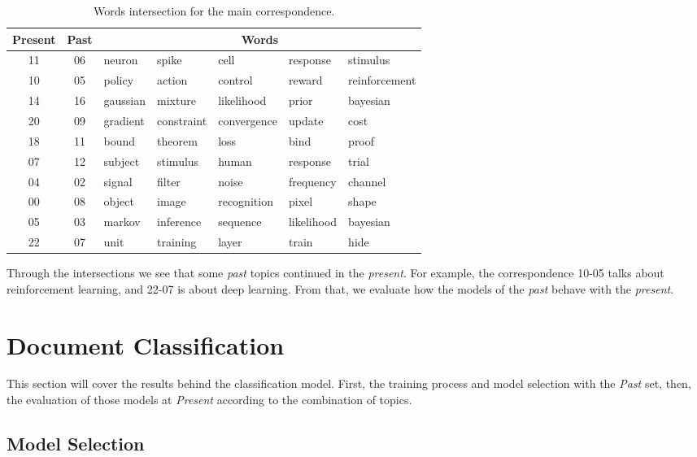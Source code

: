 \begin{table}[h!]
	\centering
	\caption{Words intersection for the main correspondence.}
	\label{tab:correspondence-words}
	\begin{tabular}{cc|lllll}
		\toprule
		\textbf{Present} & \textbf{Past} & \multicolumn{5}{c}{\textbf{Words}} \\ \midrule
		11 & 06 & neuron   & spike      & cell        & response   & stimulus      \\
		10 & 05 & policy   & action     & control     & reward     & reinforcement \\
		14 & 16 & gaussian & mixture    & likelihood  & prior      & bayesian      \\
		20 & 09 & gradient & constraint & convergence & update     & cost          \\
		18 & 11 & bound    & theorem    & loss        & bind       & proof         \\
		07 & 12 & subject  & stimulus   & human       & response   & trial         \\
		04 & 02 & signal   & filter     & noise       & frequency  & channel       \\
		00 & 08 & object   & image      & recognition & pixel      & shape         \\
		05 & 03 & markov   & inference  & sequence    & likelihood & bayesian      \\
		22 & 07 & unit     & training   & layer       & train      & hide          \\ \bottomrule
	\end{tabular}
\end{table}

Through the intersections we see that some \textit{past} topics continued in the \textit{present}. For example, the correspondence 10-05 talks about reinforcement learning, and 22-07 is about deep learning. From that, we evaluate how the models of the \textit{past} behave with the \textit{present}.

\section{Document Classification}

This section will cover the results behind the classification model. First, the training process and model selection with the \textit{Past} set, then, the evaluation of those models at \textit{Present} according to the combination of topics.

\subsection{Model Selection}

